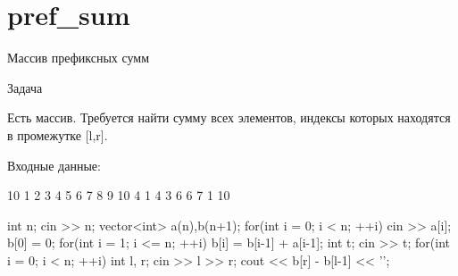 \section{pref\_sum}


\begin{frame}
    \center \Huge Массив префиксных сумм
\end{frame}


\begin{frame}[fragile]
    \center\huge{Задача}

    \normalsize
    \quad Есть массив. Требуется найти сумму всех элементов, индексы которых находятся в промежутке [l,r].

    \centering
    Входные данные:
    \begin{cpp}
10 
1 2 3 4 5 6 7 8 9 10 
4 
1 4
3 6
6 7
1 10
    \end{cpp}
\end{frame}


\begin{frame}[fragile]
    \begin{cpp}
int n; cin >> n;
vector<int> a(n),b(n+1);
for(int i = 0; i < n; ++i){
    cin >> a[i];
}
b[0] = 0;
for(int i = 1; i <= n; ++i){
    b[i] = b[i-1] + a[i-1];
}
int t; cin >> t;
for(int i = 0; i < n; ++i){
    int l, r; cin >> l >> r;
    cout << b[r] - b[l-1] << '\n';
}
    \end{cpp}
\end{frame}

